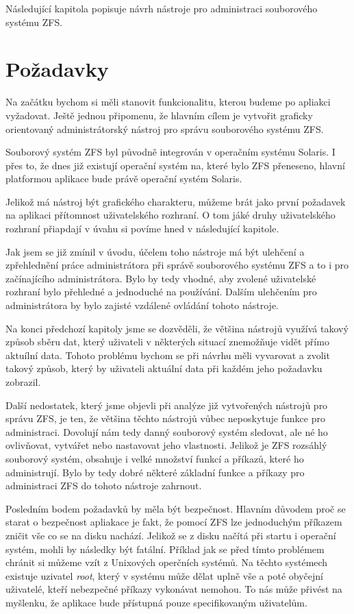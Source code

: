 Následující kapitola popisuje návrh nástroje pro administraci souborového systému ZFS.
\section{Požadavky}
Na začátku bychom si měli stanovit funkcionalitu, kterou budeme po apliakci vyžadovat. Ještě jednou připomenu, že hlavním cílem je vytvořit graficky orientovaný administrátorský nástroj pro správu souborového systému ZFS.

Souborový systém ZFS byl původně integrován v operačním systému Solaris. I přes to, že dnes již existují operační systém na, které bylo ZFS přeneseno, hlavní platformou aplikace bude právě operační systém Solaris.

Jelikož má nástroj být grafického charakteru, můžeme brát jako první požadavek na aplikaci přítomnost uživatelského rozhraní. O tom jáké druhy uživatelského rozhraní přiapdají v úvahu si povíme hned v následující kapitole.

Jak jsem se již zmínil v úvodu, účelem toho nástroje má být ulehčení a zpřehlednění práce administrátora při správě souborového systému ZFS a to i pro začínajícího administrátora.  Bylo by tedy vhodné, aby zvolené uživatelské rozhraní bylo přehledné a jednoduché na používání. Dalším ulehčením pro administrátora by bylo zajisté vzdálené ovládání tohoto nástroje.

Na konci předchozí kapitoly jsme se dozvěděli, že většina nástrojů využívá takový způsob sběru dat, který uživateli v některých situací znemožňuje vidět přímo aktuílní data. Tohoto problému bychom se při návrhu měli vyvarovat a zvolit takový způsob, který by uživateli aktuální data při každém jeho požadavku zobrazil.

Další nedostatek, který jsme objevli při analýze již vytvořených nástrojů pro správu ZFS, je ten, že většina těchto nástrojů vůbec neposkytuje funkce pro administraci. Dovolují nám tedy danný souborový systém sledovat, ale né ho ovlivňovat, vytvářet nebo nastavovat jeho vlastnosti. Jelikož je ZFS rozsáhlý souborový systém, obsahuje i velké množství funkcí a příkazů, které ho administrují. Bylo by tedy dobré některé základní funkce a příkazy pro administraci ZFS do tohoto nástroje zahrnout.

Posledním bodem požadavků by měla být bezpečnost. Hlavním důvodem proč se starat o bezpečnost apliakace je fakt, že pomocí ZFS lze jednoduchým příkazem zničit vše co se na disku nachází. Jelikož se z disku načítá při startu i operační systém, mohli by následky být fatální. Příklad jak se před tímto problémem chránit si můžeme vzít z Unixových operčních systémů. Na těchto systémech existuje uzivatel \emph{root}, který v systému může dělat uplně vše a poté obyčejní uživatelé, kteří nebezpečné příkazy vykonávat nemohou. To nás může přivést na myšlenku, že aplikace bude přístupná pouze specifikovaným uživatelům.


